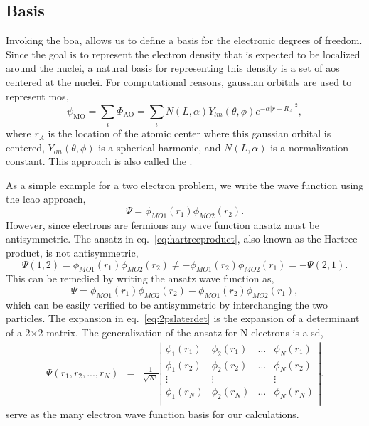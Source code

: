 \subsection{Basis}
Invoking the \gls{boa}, allows us to define a basis for the electronic degrees of freedom.
Since the goal is to represent the electron density that is expected to be localized around the nuclei, a natural basis for representing this density is a set of \glspl{ao} centered at the nuclei.
For computational reasons, gaussian orbitals are used to represent \glspl{mo},
\begin{equation}
\psi_{\textrm{MO}} = \sum_{i} \Phi_{\textrm{AO}} = \sum_{i} N(L, \alpha) Y_{lm}(\theta, \phi) e^{-\alpha |r - R_A|^2},
\end{equation}
where $r_A$ is the location of the atomic center where this gaussian orbital is centered, $Y_{lm}(\theta, \phi)$ is a spherical harmonic, and $N(L, \alpha)$ is a normalization constant.
This approach is also called the .

As a simple example for a two electron problem, we write the wave function using the \gls{lcao} approach,
\begin{equation}
\Psi = \phi_{MO1}(r_1) \phi_{MO2}(r_2).
\label{eq:hartreeproduct}
\end{equation}
However, since electrons are fermions any wave function ansatz must be antisymmetric.
The ansatz in eq.~\ref{eq:hartreeproduct}, also known as the Hartree product, is not antisymmetric,
\begin{equation}
\Psi(1,2) = \phi_{MO1}(r_1) \phi_{MO2}(r_2) \neq -\phi_{MO1}(r_2) \phi_{MO2}(r_1) = -\Psi(2,1).
\end{equation}
This can be remedied by writing the ansatz wave function as, 
\begin{equation}
\Psi = \phi_{MO1}(r_1) \phi_{MO2}(r_2) - \phi_{MO1}(r_2) \phi_{MO2}(r_1),
\label{eq:2pslaterdet}
\end{equation}
which can be easily verified to be antisymmetric by interchanging the two particles.
The expansion in eq.~\ref{eq:2pslaterdet} is the expansion of a determinant of a 2$\times$2 matrix.
The generalization of the ansatz for N electrons is a \gls{sd},
\begin{eqnarray}
	\Psi(r_1,r_2,...,r_N) &=& \frac{1}{\sqrt{N!}} 
		\left|
			\begin{array}{cccc}
				\phi_1(r_1) & \phi_2(r_1) & \ldots & \phi_N(r_1) \\
				\phi_1(r_2) & \phi_2(r_2) & \ldots & \phi_N(r_2) \\
				\vdots      & \vdots      &        & \vdots      \\
				\phi_1(r_N) & \phi_2(r_N) & \ldots & \phi_N(r_N) \\
			\end{array}
		\right|.
\end{eqnarray}
 serve as the many electron wave function basis for our calculations.
